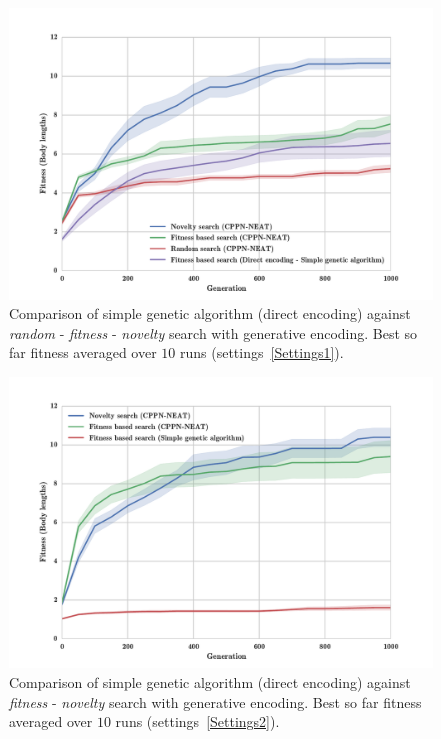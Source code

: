 \begin{figure}[t!]
\centering
\includegraphics[width=1.0\textwidth]{../Figures/Results/FitNovRandomDirectSize5.pdf}
\caption{Comparison of simple genetic algorithm (direct encoding) against \emph{random} - \emph{fitness} - \emph{novelty} search with generative encoding. Best so far fitness averaged over $10$ runs (settings~\ref{Settings1}).}
\label{fig:FitNovRandomDirectSize5}
\end{figure}

\begin{figure}[t!]
\centering
\includegraphics[width=1.0\textwidth]{../Figures/Results/FitvsNovVsDirSize10.pdf}
\caption{Comparison of simple genetic algorithm (direct encoding) against \emph{fitness} - \emph{novelty} search with generative encoding. Best so far fitness averaged over $10$ runs (settings~\ref{Settings2}).}
\label{fig:FitvsNovVsDirSize10}
\end{figure}

